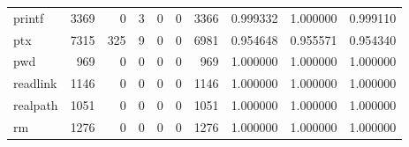 \begin{tabular}{lrrrrrrrrr}
printf    &                                3369 &                                               0 &                                              3 &                                             0 &                                              0 &                                         3366 &                                           0.999332 &                               1.000000 &                             0.999110 \\
ptx       &                                7315 &                                             325 &                                              9 &                                             0 &                                              0 &                                         6981 &                                           0.954648 &                               0.955571 &                             0.954340 \\
pwd       &                                 969 &                                               0 &                                              0 &                                             0 &                                              0 &                                          969 &                                           1.000000 &                               1.000000 &                             1.000000 \\
readlink  &                                1146 &                                               0 &                                              0 &                                             0 &                                              0 &                                         1146 &                                           1.000000 &                               1.000000 &                             1.000000 \\
realpath  &                                1051 &                                               0 &                                              0 &                                             0 &                                              0 &                                         1051 &                                           1.000000 &                               1.000000 &                             1.000000 \\
rm        &                                1276 &                                               0 &                                              0 &                                             0 &                                              0 &                                         1276 &                                           1.000000 &                               1.000000 &                             1.000000 \\

\end{tabular}

